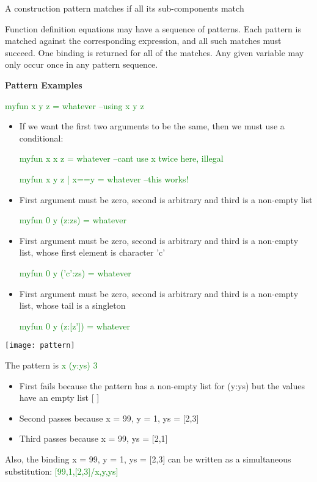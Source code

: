 \documentclass{article}
\begin{document}
A construction pattern matches if all its sub-components match


Function definition equations may have a sequence of patterns. Each pattern is matched against the corresponding expression, and all such matches must succeed. One binding is returned for all of the matches. Any given variable may only occur once in any pattern sequence.


\textbf{Pattern Examples}

\textcolor{green}{myfun  x  y  z = whatever --using x  y  z}

\begin{itemize}
\item If we want the first two arguments to be the same, then we must use a conditional:

\textcolor{green}{myfun  x  x  z = whatever --cant use x twice here, illegal}

\textcolor{green}{myfun  x  y  z | x==y = whatever --this works!}

\item First argument must be zero, second is arbitrary and third is a non-empty list

\textcolor{green}{myfun  0  y  (z:zs) = whatever}

\item First argument must be zero, second is arbitrary and third is a non-empty list, whose first element is character 'c'

\textcolor{green}{myfun  0  y  ('c':zs) = whatever}

\item First argument must be zero, second is arbitrary and third is a non-empty list, whose tail is a singleton

\textcolor{green}{myfun  0  y  (z:[z']) = whatever}

\end{itemize}

\texttt{[image: pattern]}

The pattern is \textcolor{green}{x  (y:ys)  3}
\begin{itemize}
\item First fails because the pattern has a non-empty list for (y:ys) but the values have an empty list [ ]
\item Second passes because x = 99, y = 1, ys = [2,3]
\item Third passes because x = 99, ys = [2,1]
\end{itemize}

Also, the binding x = 99, y = 1, ys = [2,3] can be written as a simultaneous substitution: \textcolor{green}{[99,1,[2,3]/x,y,ys]}
\end{document}

